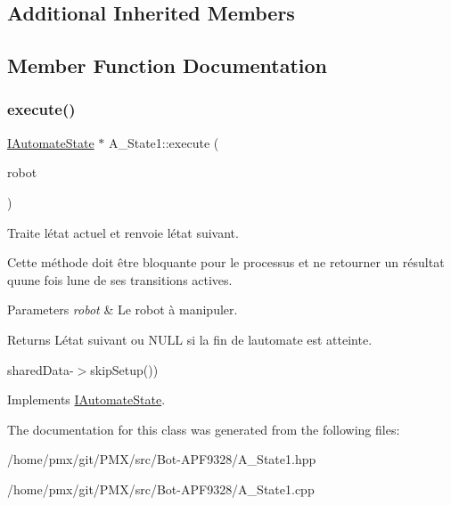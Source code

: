 \subsection*{Additional Inherited Members}


\subsection{Member Function Documentation}
\mbox{\label{classA__State1_a351a7c94100ccc0dfb8a09e2037d4cc2}} 
\subsubsection{\texorpdfstring{execute()}{execute()}}
{\footnotesize\ttfamily \hyperlink{classIAutomateState}{I\+Automate\+State} $\ast$ A\+\_\+\+State1\+::execute (\begin{DoxyParamCaption}\item[{\hyperlink{classRobot}{Robot} \&}]{robot }\end{DoxyParamCaption})\hspace{0.3cm}{\ttfamily [virtual]}}



Traite l\textquotesingle{}état actuel et renvoie l\textquotesingle{}état suivant. 

Cette méthode doit être bloquante pour le processus et ne retourner un résultat qu\textquotesingle{}une fois l\textquotesingle{}une de ses transitions actives.


\begin{DoxyParams}{Parameters}
{\em robot} & Le robot à manipuler. \\
\hline
\end{DoxyParams}
\begin{DoxyReturn}{Returns}
L\textquotesingle{}état suivant ou {\ttfamily N\+U\+LL} si la fin de l\textquotesingle{}automate est atteinte. 
\end{DoxyReturn}
shared\+Data-\/$>$skip\+Setup()) 

Implements \hyperlink{classIAutomateState_a58bf3c2c5b55f7ba3fc1783fc36e102b}{I\+Automate\+State}.



The documentation for this class was generated from the following files\+:\begin{DoxyCompactItemize}
\item 
/home/pmx/git/\+P\+M\+X/src/\+Bot-\/\+A\+P\+F9328/A\+\_\+\+State1.\+hpp\item 
/home/pmx/git/\+P\+M\+X/src/\+Bot-\/\+A\+P\+F9328/A\+\_\+\+State1.\+cpp\end{DoxyCompactItemize}
